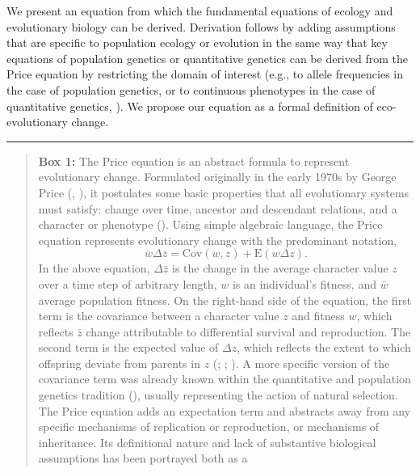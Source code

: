 \documentclass[
]{article}
\begin{document}
We present an equation from which the fundamental equations of ecology
and evolutionary biology can be derived. Derivation follows by adding
assumptions that are specific to population ecology or evolution in the
same way that key equations of population genetics or quantitative
genetics can be derived from the Price equation by restricting the
domain of interest (e.g., to allele frequencies in the case of
population genetics, or to continuous phenotypes in the case of
quantitative genetics, ). We
propose our equation as a formal definition of eco-evolutionary change.

\begin{center}\rule{0.5\linewidth}{0.5pt}\end{center}

\begin{quote}
\textbf{Box 1:} The Price equation is an abstract formula to represent
evolutionary change. Formulated originally in the early 1970s by George
Price (,
), it postulates some basic properties
that all evolutionary systems must satisfy: change over time, ancestor
and descendant relations, and a character or phenotype
(). Using simple algebraic language,
the Price equation represents evolutionary change with the predominant
notation,
\[\bar{w}\Delta\bar{z} = \mathrm{Cov}\left(w, z\right) + \mathrm{E}\left(w\Delta z\right).\]
In the above equation, \(\Delta\bar{z}\) is the change in the average
character value \(z\) over a time step of arbitrary length, \(w\) is an
individual's fitness, and \(\bar{w}\) average population fitness. On the
right-hand side of the equation, the first term is the covariance
between a character value \(z\) and fitness \(w\), which reflects
\(\bar{z}\) change attributable to differential survival and
reproduction. The second term is the expected value of \(\Delta z\),
which reflects the extent to which offspring deviate from parents in
\(z\) (;
; ). A more specific version of the covariance term was already known
within the quantitative and population genetics tradition
(), usually representing the
action of natural selection. The Price equation adds an expectation term
and abstracts away from any specific mechanisms of replication or
reproduction, or mechanisms of inheritance. Its definitional nature and
lack of substantive biological assumptions has been portrayed both as a

\end{quote}
\end{document}
